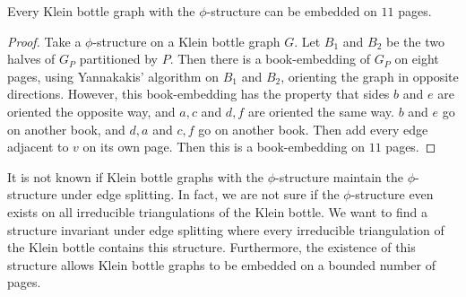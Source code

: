 \begin{claim}
    Every Klein bottle graph with the $\phi$-structure can be embedded on $11$ pages. 
\end{claim}
\begin{proof}
    Take a $\phi$-structure on a Klein bottle graph $G$. Let $B_1$ and $B_2$ be the two halves of $G_P$ partitioned by $P$. Then there is a book-embedding of $G_P$ on eight pages, using Yannakakis' algorithm on $B_1$ and $B_2$, orienting the graph in opposite directions. However, this book-embedding has the property that sides $b$ and $e$ are oriented the opposite way, and $a, c$ and $d, f$ are oriented the same way. $b$ and $e$ go on another book, and $d, a$ and $c, f$ go on another book. Then add every edge adjacent to $v$ on its own page. Then this is a book-embedding on $11$ pages. 
\end{proof}

It is not known if Klein bottle graphs with the $\phi$-structure maintain the $\phi$-structure under edge splitting. In fact, we are not sure if the $\phi$-structure even exists on all irreducible triangulations of the Klein bottle. We want to find a structure invariant under edge splitting where every irreducible triangulation of the Klein bottle contains this structure. Furthermore, the existence of this structure allows Klein bottle graphs to be embedded on a bounded number of pages.
